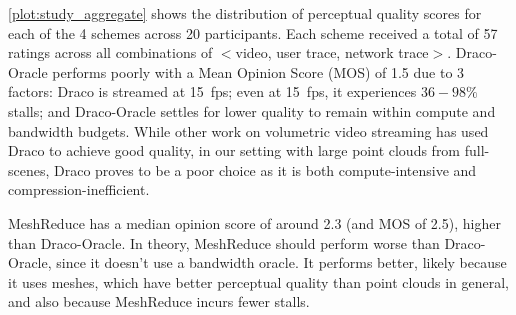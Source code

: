 %
\cref{plot:study_aggregate} shows the distribution of perceptual quality scores for each of the 4 schemes across 20 participants.
%
Each scheme received a total of 57 ratings across all combinations of $<$video, user trace, network trace$>$.
%
Draco-Oracle performs poorly with a Mean Opinion Score (MOS) of 1.5 due to 3 factors: Draco is streamed at 15~fps; even at 15~fps, it experiences $36-98\%$ stalls; and Draco-Oracle settles for lower quality to remain within compute and bandwidth budgets.
%
While other work on volumetric video streaming has used Draco to achieve good quality, in our setting with large point clouds from full-scenes, Draco proves to be a poor choice as it is both compute-intensive and compression-inefficient.


MeshReduce has a median opinion score of around 2.3 (and MOS of 2.5), higher than Draco-Oracle.
%
In theory, MeshReduce should perform worse than Draco-Oracle, since it doesn't use a bandwidth oracle.
%
It performs better, likely because it uses meshes, which have better perceptual quality than point clouds in general, and also because MeshReduce incurs fewer stalls.

